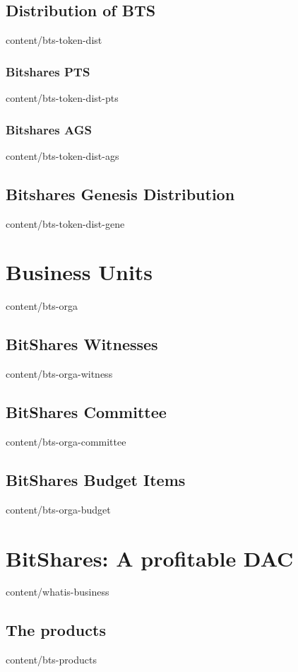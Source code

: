 \documentclass{btswhitepaper}
\begin{document}
\subsection    { Distribution of BTS               }  { content/bts-token-dist      } 
\subsubsection { Bitshares PTS                     }  { content/bts-token-dist-pts  } 
\subsubsection { Bitshares AGS                     }  { content/bts-token-dist-ags  } 
\subsection    { Bitshares Genesis Distribution    }  { content/bts-token-dist-gene } 

\section       { Business Units                    }  { content/bts-orga            }
\subsection    { BitShares Witnesses               }  { content/bts-orga-witness    }
\subsection    { BitShares Committee               }  { content/bts-orga-committee  }
\subsection    { BitShares Budget Items            }  { content/bts-orga-budget     }

\section       { BitShares: A profitable DAC       }  { content/whatis-business     } 
\subsection    { The products                      }  { content/bts-products        }
\end{document}
